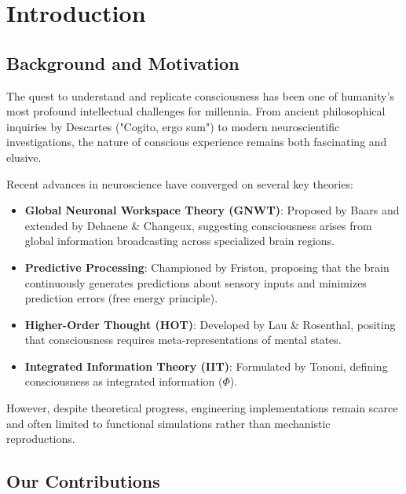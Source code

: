 \documentclass[twocolumn,10pt]{article}
\begin{document}
\section{Introduction}

\subsection{Background and Motivation}

The quest to understand and replicate consciousness has been one of humanity's most profound intellectual challenges for millennia. From ancient philosophical inquiries by Descartes ("Cogito, ergo sum") to modern neuroscientific investigations, the nature of conscious experience remains both fascinating and elusive.

Recent advances in neuroscience have converged on several key theories:

\begin{itemize}
    \item \textbf{Global Neuronal Workspace Theory (GNWT)}: Proposed by Baars and extended by Dehaene \& Changeux, suggesting consciousness arises from global information broadcasting across specialized brain regions.
    
    \item \textbf{Predictive Processing}: Championed by Friston, proposing that the brain continuously generates predictions about sensory inputs and minimizes prediction errors (free energy principle).
    
    \item \textbf{Higher-Order Thought (HOT)}: Developed by Lau \& Rosenthal, positing that consciousness requires meta-representations of mental states.
    
    \item \textbf{Integrated Information Theory (IIT)}: Formulated by Tononi, defining consciousness as integrated information ($\Phi$).
\end{itemize}

However, despite theoretical progress, engineering implementations remain scarce and often limited to functional simulations rather than mechanistic reproductions.

\subsection{Our Contributions}
\end{document}

